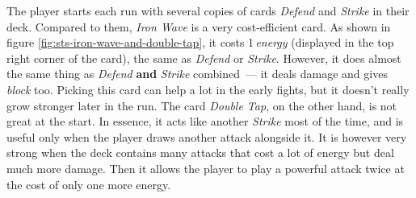 The player starts each run with several copies of cards \emph{Defend} and \emph{Strike} in their deck.
Compared to them, \emph{Iron Wave} is a very cost-efficient card.
As shown in figure \ref{fig:sts-iron-wave-and-double-tap}, it costs 1\,\emph{energy} (displayed in the top right corner of the card), the same as \emph{Defend} or \emph{Strike}.
However, it does almost the same thing as \emph{Defend} \textbf{and} \emph{Strike} combined~--- it deals damage and gives \emph{block} too.
Picking this card can help a lot in the early fights, but it doesn't really grow stronger later in the run.
The card \emph{Double Tap}, on the other hand, is not great at the start.
In essence, it acts like another \emph{Strike} most of the time, and is useful only when the player draws another attack alongside it.
It is however very strong when the deck contains many attacks that cost a lot of energy but deal much more damage.
Then it allows the player to play a powerful attack twice at the cost of only one more energy.

